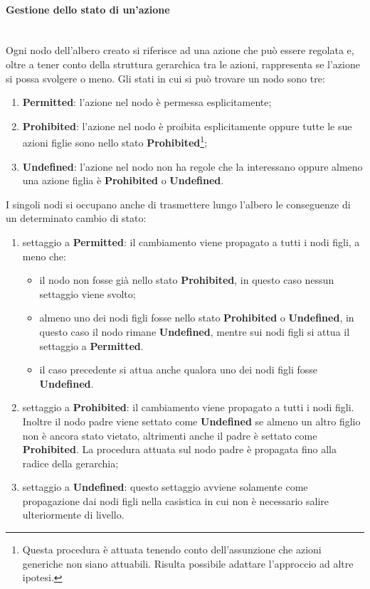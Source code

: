 \documentclass[12pt,a4paper,twoside]{book}
\begin{document}
\paragraph{Gestione dello stato di un'azione}\mbox{}\\
\label{ruleTree}
Ogni nodo dell'albero creato si riferisce ad una azione che può essere regolata e, oltre a tener conto della struttura gerarchica tra le azioni, rappresenta se l'azione si possa svolgere o meno. Gli stati in cui si può trovare un nodo sono tre:
\begin{enumerate}
\item \textbf{Permitted}: l'azione nel nodo è permessa esplicitamente;
\item \textbf{Prohibited}: l'azione nel nodo è proibita esplicitamente oppure tutte le sue azioni figlie sono nello stato \textbf{Prohibited}\footnote{Questa procedura è attuata tenendo conto dell'assunzione che azioni generiche non siano attuabili. Risulta possibile adattare l'approccio ad altre ipotesi.};
\item \textbf{Undefined}: l'azione nel nodo non ha regole che la interessano oppure almeno una azione figlia è \textbf{Prohibited} o \textbf{Undefined}.
\end{enumerate}
I singoli nodi si occupano anche di trasmettere lungo l'albero le conseguenze di un determinato cambio di stato:
\begin{enumerate}
\item settaggio a \textbf{Permitted}: il cambiamento viene propagato a tutti i nodi figli, a meno che:
\begin{itemize}
\item il nodo non fosse già nello stato \textbf{Prohibited}, in questo caso nessun settaggio viene svolto;
\item almeno uno dei nodi figli fosse nello stato \textbf{Prohibited} o \textbf{Undefined}, in questo caso il nodo rimane  \textbf{Undefined}, mentre sui nodi figli si attua il settaggio a \textbf{Permitted}.
\item il caso precedente si attua anche qualora uno dei nodi figli fosse \textbf{Undefined}.
\end{itemize}
\item settaggio a \textbf{Prohibited}: il cambiamento viene propagato a tutti i nodi figli. Inoltre il nodo padre viene settato come \textbf{Undefined} se almeno un altro figlio non è ancora stato vietato, altrimenti anche il padre è settato come \textbf{Prohibited}. La procedura attuata sul nodo padre è propagata fino alla radice della gerarchia;
\item settaggio a \textbf{Undefined}: questo settaggio avviene solamente come propagazione dai nodi figli nella casistica in cui non è necessario salire ulteriormente di livello.
\end{enumerate}
\end{document}
